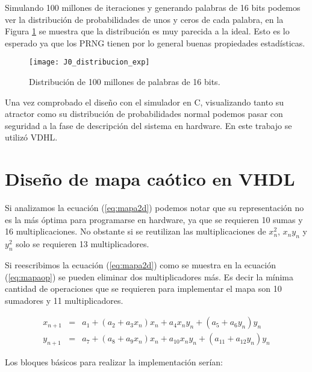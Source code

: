         Simulando 100 millones de iteraciones y generando palabras de 16 bits podemos ver la distribución de probabilidades de unos y ceros de cada palabra, en la Figura \ref{fig:J0_distribucion_exp} se muestra que la distribución es muy parecida a la ideal. Esto es lo esperado ya que los PRNG tienen por lo general buenas propiedades estadísticas.

        \begin{figure}[hbtp]
            \centering
            \texttt{[image: J0\_distribucion\_exp]}
            \caption{Distribución de 100 millones de palabras de 16 bits.}
            \label{fig:J0_distribucion_exp}
        \end{figure}

        Una vez comprobado el diseño con el simulador en C, visualizando tanto su atractor como su distribución de probabilidades normal podemos pasar con seguridad a la fase de descripción del sistema en hardware. En este trabajo se utilizó VDHL.

    \section{Diseño de mapa caótico en VHDL}

        Si analizamos la ecuación (\ref{eq:mapa2d}) podemos notar que su representación no es la más óptima para programarse en hardware, ya que se requieren 10 sumas y 16 multiplicaciones. No obstante si se reutilizan las multiplicaciones de $x_{n}^{2}$, $x_{n}y_{n}$ y $y_{n}^{2}$ solo se requieren 13 multiplicadores.

        Si reescribimos la ecuación (\ref{eq:mapa2d}) como se muestra en la ecuación (\ref{eq:mapaop}) se pueden eliminar dos multiplicadores más. Es decir la mínima cantidad de operaciones que se requieren para implementar el mapa son 10 sumadores y 11 multiplicadores.

        \begin{equation}
            \begin{array}{ccl}
                x_{n+1} & = &  a_{1} + ( a_{2} + a_{3}x_{n} )x_{n} + a_{4}x_{n}y_{n} + ( a_{5} + a_{6}y_{n} )y_{n} \\
                y_{n+1} & = &  a_{7} + ( a_{8} + a_{9}x_{n} )x_{n} + a_{10}x_{n}y_{n} + ( a_{11} + a_{12}y_{n})y_{n}
            \end{array}
            \label{eq:mapaop}
        \end{equation}

        Los bloques básicos para realizar la implementación serían: 
            
